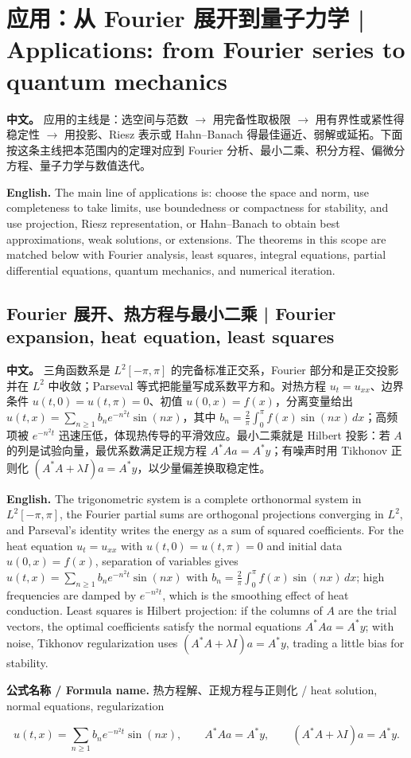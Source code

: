 \documentclass[UTF8,11pt,a4paper]{ctexart}
\newcommand{\FORMULA}[2]{\par\noindent\textbf{公式名称 / Formula name.} #1 / #2\par}
\newcommand{\APS}[2]{\par\noindent\textbf{中文。} #1\par\noindent\textbf{English.} #2\par\smallskip}
\begin{document}
\section[应用 | Applications]{应用：从 Fourier 展开到量子力学 | Applications: from Fourier series to quantum mechanics}
\APS{应用的主线是：选空间与范数 $\to$ 用完备性取极限 $\to$ 用有界性或紧性得稳定性 $\to$ 用投影、Riesz 表示或 Hahn--Banach 得最佳逼近、弱解或延拓。下面按这条主线把本范围内的定理对应到 Fourier 分析、最小二乘、积分方程、偏微分方程、量子力学与数值迭代。}{The main line of applications is: choose the space and norm, use completeness to take limits, use boundedness or compactness for stability, and use projection, Riesz representation, or Hahn--Banach to obtain best approximations, weak solutions, or extensions. The theorems in this scope are matched below with Fourier analysis, least squares, integral equations, partial differential equations, quantum mechanics, and numerical iteration.}

\subsection{Fourier 展开、热方程与最小二乘 | Fourier expansion, heat equation, least squares}
\APS{三角函数系是 $L^2[-\pi,\pi]$ 的完备标准正交系，Fourier 部分和是正交投影并在 $L^2$ 中收敛；Parseval 等式把能量写成系数平方和。对热方程 $u_t=u_{xx}$、边界条件 $u(t,0)=u(t,\pi)=0$、初值 $u(0,x)=f(x)$，分离变量给出 $u(t,x)=\sum_{n\ge1}b_ne^{-n^2t}\sin(nx)$，其中 $b_n=\frac2\pi\int_0^\pi f(x)\sin(nx)\,dx$；高频项被 $e^{-n^2t}$ 迅速压低，体现热传导的平滑效应。最小二乘就是 Hilbert 投影：若 $A$ 的列是试验向量，最优系数满足正规方程 $A^*Aa=A^*y$；有噪声时用 Tikhonov 正则化 $(A^*A+\lambda I)a=A^*y$，以少量偏差换取稳定性。}{The trigonometric system is a complete orthonormal system in $L^2[-\pi,\pi]$, the Fourier partial sums are orthogonal projections converging in $L^2$, and Parseval's identity writes the energy as a sum of squared coefficients. For the heat equation $u_t=u_{xx}$ with $u(t,0)=u(t,\pi)=0$ and initial data $u(0,x)=f(x)$, separation of variables gives $u(t,x)=\sum_{n\ge1}b_ne^{-n^2t}\sin(nx)$ with $b_n=\frac2\pi\int_0^\pi f(x)\sin(nx)\,dx$; high frequencies are damped by $e^{-n^2t}$, which is the smoothing effect of heat conduction. Least squares is Hilbert projection: if the columns of $A$ are the trial vectors, the optimal coefficients satisfy the normal equations $A^*Aa=A^*y$; with noise, Tikhonov regularization uses $(A^*A+\lambda I)a=A^*y$, trading a little bias for stability.}
\FORMULA{热方程解、正规方程与正则化}{heat solution, normal equations, regularization}
\[
u(t,x)=\sum_{n\ge1}b_ne^{-n^2t}\sin(nx),
\qquad
A^*Aa=A^*y,
\qquad
(A^*A+\lambda I)a=A^*y.
\]
\end{document}
